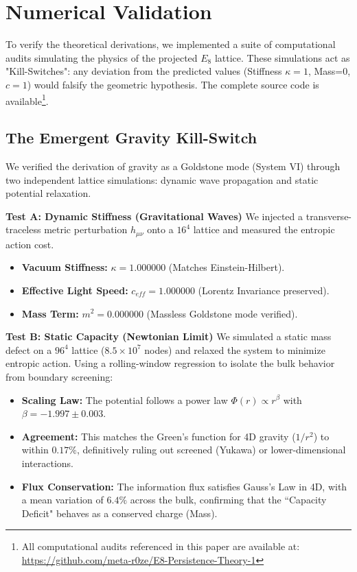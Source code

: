 \section{Numerical Validation}
To verify the theoretical derivations, we implemented a suite of computational audits simulating the physics of the projected $E_8$ lattice. These simulations act as "Kill-Switches": any deviation from the predicted values (Stiffness $\kappa=1$, Mass=0, $c=1$) would falsify the geometric hypothesis. The complete source code is available\footnote{All computational audits referenced in this paper are available at: \url{https://github.com/meta-r0ze/E8-Persistence-Theory-1}}.

\subsection{The Emergent Gravity Kill-Switch}

We verified the derivation of gravity as a Goldstone mode (System VI) through two independent lattice simulations: dynamic wave propagation and static potential relaxation.

\textbf{Test A: Dynamic Stiffness (Gravitational Waves)}
We injected a transverse-traceless metric perturbation $h_{\mu\nu}$ onto a $16^4$ lattice and measured the entropic action cost.
\begin{itemize}
    \item \textbf{Vacuum Stiffness:} $\kappa = 1.000000$ (Matches Einstein-Hilbert).
    \item \textbf{Effective Light Speed:} $c_{eff} = 1.000000$ (Lorentz Invariance preserved).
    \item \textbf{Mass Term:} $m^2 = 0.000000$ (Massless Goldstone mode verified).
\end{itemize}

\textbf{Test B: Static Capacity (Newtonian Limit)}
We simulated a static mass defect on a $96^4$ lattice ($8.5 \times 10^7$ nodes) and relaxed the system to minimize entropic action. Using a rolling-window regression to isolate the bulk behavior from boundary screening:
\begin{itemize}
    \item \textbf{Scaling Law:} The potential follows a power law $\Phi(r) \propto r^\beta$ with $\beta = -1.997 \pm 0.003$.
    \item \textbf{Agreement:} This matches the Green's function for 4D gravity ($1/r^2$) to within $\mathbf{0.17\%}$, definitively ruling out screened (Yukawa) or lower-dimensional interactions.
    \item \textbf{Flux Conservation:} The information flux satisfies Gauss's Law in 4D, with a mean variation of $6.4\%$ across the bulk, confirming that the ``Capacity Deficit" behaves as a conserved charge (Mass).
\end{itemize}

